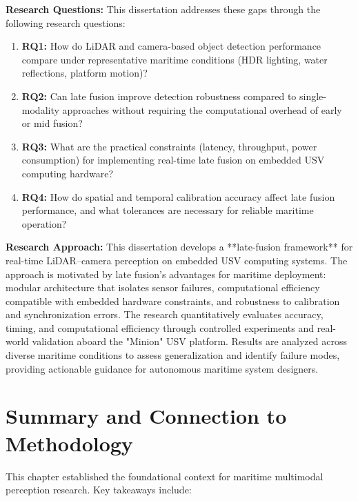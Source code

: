 \documentclass{erauthesis}
\begin{document}
\textbf{Research Questions:} This dissertation addresses these gaps through the following research questions:
\begin{enumerate}
    \item \textbf{RQ1:} How do LiDAR and camera-based object detection performance compare under representative maritime conditions (HDR lighting, water reflections, platform motion)?
    \item \textbf{RQ2:} Can late fusion improve detection robustness compared to single-modality approaches without requiring the computational overhead of early or mid fusion?
    \item \textbf{RQ3:} What are the practical constraints (latency, throughput, power consumption) for implementing real-time late fusion on embedded USV computing hardware?
    \item \textbf{RQ4:} How do spatial and temporal calibration accuracy affect late fusion performance, and what tolerances are necessary for reliable maritime operation?
\end{enumerate}

\textbf{Research Approach:} This dissertation develops a **late-fusion framework** for real-time LiDAR–camera perception on embedded USV computing systems. The approach is motivated by late fusion's advantages for maritime deployment: modular architecture that isolates sensor failures, computational efficiency compatible with embedded hardware constraints, and robustness to calibration and synchronization errors. The research quantitatively evaluates accuracy, timing, and computational efficiency through controlled experiments and real-world validation aboard the "Minion" USV platform. Results are analyzed across diverse maritime conditions to assess generalization and identify failure modes, providing actionable guidance for autonomous maritime system designers.


\section{Summary and Connection to Methodology}

This chapter established the foundational context for maritime multimodal perception research. Key takeaways include:
\end{document}
